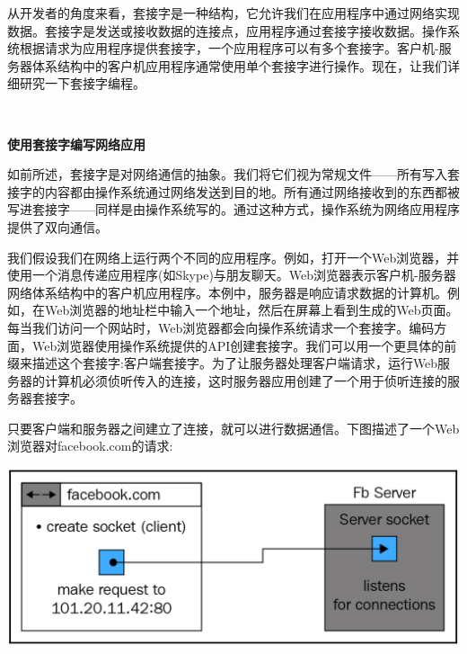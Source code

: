 从开发者的角度来看，套接字是一种结构，它允许我们在应用程序中通过网络实现数据。套接字是发送或接收数据的连接点，应用程序通过套接字接收数据。操作系统根据请求为应用程序提供套接字，一个应用程序可以有多个套接字。客户机-服务器体系结构中的客户机应用程序通常使用单个套接字进行操作。现在，让我们详细研究一下套接字编程。 \par

\noindent\textbf{}\ \par
\textbf{使用套接字编写网络应用} \ \par
如前所述，套接字是对网络通信的抽象。我们将它们视为常规文件——所有写入套接字的内容都由操作系统通过网络发送到目的地。所有通过网络接收到的东西都被写进套接字——同样是由操作系统写的。通过这种方式，操作系统为网络应用程序提供了双向通信。 \par
我们假设我们在网络上运行两个不同的应用程序。例如，打开一个Web浏览器，并使用一个消息传递应用程序(如Skype)与朋友聊天。Web浏览器表示客户机-服务器网络体系结构中的客户机应用程序。本例中，服务器是响应请求数据的计算机。例如，在Web浏览器的地址栏中输入一个地址，然后在屏幕上看到生成的Web页面。每当我们访问一个网站时，Web浏览器都会向操作系统请求一个套接字。编码方面，Web浏览器使用操作系统提供的API创建套接字。我们可以用一个更具体的前缀来描述这个套接字:客户端套接字。为了让服务器处理客户端请求，运行Web服务器的计算机必须侦听传入的连接，这时服务器应用创建了一个用于侦听连接的服务器套接字。 \par
只要客户端和服务器之间建立了连接，就可以进行数据通信。下图描述了一个Web浏览器对facebook.com的请求: \par

\begin{center}
	\includegraphics[width=1.0\textwidth]{content/Section-2/Chapter-12/5}
\end{center}

